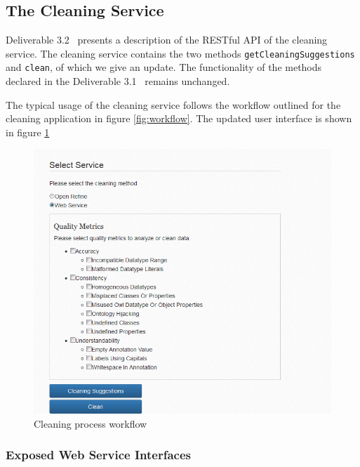 \subsection{The Cleaning Service}
\label{sec:cleaningService}

Deliverable 3.2~\cite{d3.2} presents a description of the RESTful API of the cleaning service. 
The cleaning service contains the two methods \texttt{getCleaningSuggestions} and \texttt{clean}, of which we give an update.
The functionality of the methods  declared in the Deliverable 3.1~\cite{d3.1} remains unchanged. 

The typical usage of the cleaning service follows the workflow outlined for the cleaning application in figure \ref{fig:workflow}.
The updated user interface is shown in figure \ref{fig:ui}

\begin{figure}[ht!]
\centering
\includegraphics[width=\textwidth]{figures/WebService.png}
\caption{Cleaning process workflow}
\label{fig:ui}
\end{figure}





\subsubsection{Exposed Web Service Interfaces}
\label{sec:service-API}



